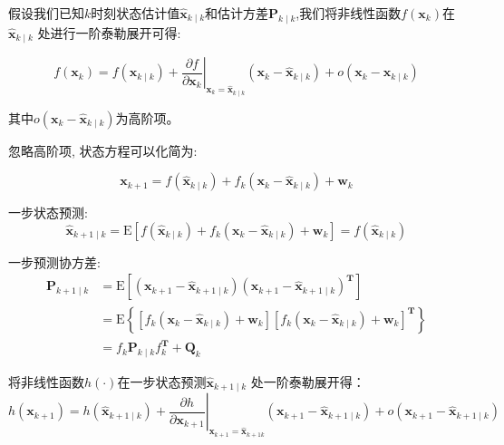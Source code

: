 \documentclass{article}
\begin{document}
假设我们已知$k$时刻状态估计值$\mathbf{\hat x}_{k \mid k}$和估计方差$\mathbf{P}_{k \mid k}$,我们将非线性函数$f\left(\mathbf{x}_{k}\right)$在$\mathbf{\hat x}_{k \mid k}$ 处进行一阶泰勒展开可得:

\begin{equation*}
    f\left(\mathbf{x}_{k}\right)=f\left(\mathbf{\hat x}_{k \mid k}\right)+\left.\frac{\partial f}{\partial \mathbf{x}_{k}}\right|_{\mathbf{x}_{k}=\mathbf{\hat x}_{k \mid k}}\left(\mathbf{x}_{k}-\mathbf{\hat x}_{k \mid k}\right)+o\left(\mathbf{x}_{k}-\mathbf{\hat x}_{k \mid k}\right)
\end{equation*}

其中$o\left(\mathbf{x}_{k}-\mathbf{\hat x}_{k \mid k}\right)$为高阶项。

忽略高阶项, 状态方程可以化简为: 

\begin{equation*}
    \mathbf{x}_{k+1}=f\left(\mathbf{\hat x}_{k \mid k}\right)+f_{k}\left(\mathbf{x}_{k}-\mathbf{\hat x}_{k \mid k}\right)+\mathbf{w}_{k} 
\end{equation*}

一步状态预测:
\begin{equation*}
    \mathbf{\hat x}_{k+1 \mid k}=\mathrm{E}\left[f\left(\mathbf{\hat x}_{k \mid k}\right)+f_{k}\left(\mathbf{x}_{k}-\mathbf{\hat x}_{k \mid k}\right)+\mathbf{w}_{k}\right]=f\left(\mathbf{\hat x}_{k \mid k}\right)
\end{equation*}

一步预测协方差:
\begin{equation*}
\begin{aligned}
\mathbf{P}_{k+1 \mid k} &=\mathrm{E}\left[\left(\mathbf{x}_{k+1}-\mathbf{\hat x}_{k+1 \mid k}\right)\left(\mathbf{x}_{k+1}-\mathbf{\hat x}_{k+1 \mid k}\right)^{\mathbf{T}}\right] \\
&=\mathrm{E}\left\{\left[f_{k}\left(\mathbf{x}_{k}-\mathbf{\hat x}_{k \mid k}\right)+\mathbf{w}_{k}\right]\left[f_{k}\left(\mathbf{x}_{k}-\mathbf{\hat x}_{k \mid k}\right)+\mathbf{w}_{k}\right]^{\mathbf{T}}\right\} \\
&=f_{k} \mathbf{P}_{k \mid k} f_{k}^{\mathbf{T}}+\mathbf{Q}_{k}
\end{aligned}
\end{equation*}

将非线性函数$h(\cdot)$在一步状态预测$\hat{\mathbf{x}}_{k+1 \mid k}$  处一阶泰勒展开得：
\begin{equation*}
h\left(\mathbf{x}_{k+1}\right)=h\left(\mathbf{\hat x}_{k+1 \mid k}\right)+\left.\frac{\partial h}{\partial \mathbf{x}_{k+1}}\right|_{\mathbf{x}_{k+1}=\mathbf{\hat x}_{k+1 k}}\left(\mathbf{x}_{k+1}-\mathbf{\hat x}_{k+1 \mid k}\right)+o\left(\mathbf{x}_{k+1}-\mathbf{\hat x}_{k+1 \mid k}\right)
\end{equation*}
\end{document}
